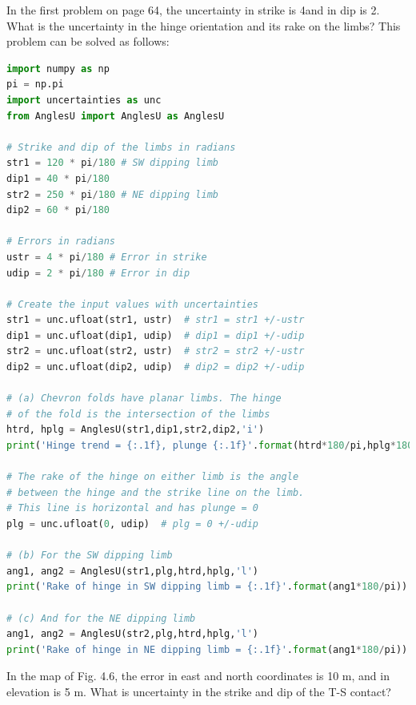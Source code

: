 \documentclass[a4paper , 12pt]{book}
\begin{document}
In the first problem on page 64, the uncertainty in strike is 4\degree and in dip is 2\degree. What is the uncertainty in the hinge orientation and its rake on the limbs? This problem can be solved as follows:

\begin{center}
\begin{lstlisting}[language=Python, frame=single]
import numpy as np
pi = np.pi
import uncertainties as unc
from AnglesU import AnglesU as AnglesU

# Strike and dip of the limbs in radians
str1 = 120 * pi/180 # SW dipping limb
dip1 = 40 * pi/180
str2 = 250 * pi/180 # NE dipping limb
dip2 = 60 * pi/180

# Errors in radians
ustr = 4 * pi/180 # Error in strike
udip = 2 * pi/180 # Error in dip

# Create the input values with uncertainties
str1 = unc.ufloat(str1, ustr)  # str1 = str1 +/-ustr
dip1 = unc.ufloat(dip1, udip)  # dip1 = dip1 +/-udip
str2 = unc.ufloat(str2, ustr)  # str2 = str2 +/-ustr
dip2 = unc.ufloat(dip2, udip)  # dip2 = dip2 +/-udip

# (a) Chevron folds have planar limbs. The hinge
# of the fold is the intersection of the limbs
htrd, hplg = AnglesU(str1,dip1,str2,dip2,'i')
print('Hinge trend = {:.1f}, plunge {:.1f}'.format(htrd*180/pi,hplg*180/pi))

# The rake of the hinge on either limb is the angle 
# between the hinge and the strike line on the limb. 
# This line is horizontal and has plunge = 0
plg = unc.ufloat(0, udip)  # plg = 0 +/-udip

# (b) For the SW dipping limb
ang1, ang2 = AnglesU(str1,plg,htrd,hplg,'l')
print('Rake of hinge in SW dipping limb = {:.1f}'.format(ang1*180/pi))

# (c) And for the NE dipping limb
ang1, ang2 = AnglesU(str2,plg,htrd,hplg,'l')
print('Rake of hinge in NE dipping limb = {:.1f}'.format(ang1*180/pi))
\end{lstlisting}
\end{center}

In the map of Fig. 4.6, the error in east and north coordinates is 10 m, and in elevation is 5 m. What is uncertainty in the strike and dip of the T-S contact? 
\end{document}
